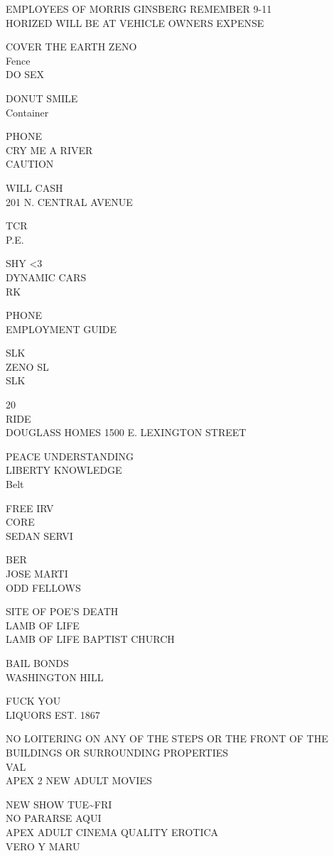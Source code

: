 \documentclass[10pt,letterpaper]{article}
\begin{document}
EMPLOYEES OF MORRIS GINSBERG REMEMBER 9{-}11\\
HORIZED WILL BE AT VEHICLE OWNERS EXPENSE

COVER THE EARTH ZENO\\
Fence\\
DO SEX

DONUT SMILE\\
Container

PHONE\\
CRY ME A RIVER\\
CAUTION

WILL CASH\\
201 N. CENTRAL AVENUE

TCR\\
P.E.

SHY <3\\
DYNAMIC CARS\\
RK

PHONE\\
EMPLOYMENT GUIDE

SLK\\
ZENO SL\\
SLK

20\\
RIDE\\
DOUGLASS HOMES 1500 E. LEXINGTON STREET

PEACE UNDERSTANDING\\
LIBERTY KNOWLEDGE\\
Belt

FREE IRV\\
CORE\\
SEDAN SERVI

BER\\
JOSE MARTI\\
ODD FELLOWS

SITE OF POE'S DEATH\\
LAMB OF LIFE\\
LAMB OF LIFE BAPTIST CHURCH

BAIL BONDS\\
WASHINGTON HILL

FUCK YOU\\
LIQUORS EST. 1867

NO LOITERING ON ANY OF THE STEPS OR THE FRONT OF THE BUILDINGS OR SURROUNDING PROPERTIES\\
VAL\\
APEX 2 NEW ADULT MOVIES

NEW SHOW TUE\textasciitilde{}FRI\\
NO PARARSE AQUI\\
APEX ADULT CINEMA QUALITY EROTICA\\
VERO Y MARU
\end{document}
